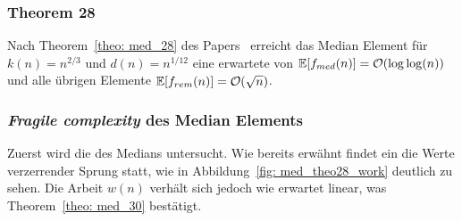 \subsubsection{Theorem 28}		%

\noindent
Nach Theorem~\ref{theo: med_28} des Papers~\cite{meyer2} erreicht das Median Element für $k(n)=n^{2/3}$ und $d(n)=n^{1/12}$ eine erwartete \fg von $\mathbb{E}[f_{med}(n)]=\mathcal{O}(\log\log(n))$ und alle übrigen Elemente $\mathbb{E}[f_{rem}(n)]=\mathcal{O}(\sqrt{n})$.\\[.1cm]





\subsubsection*{\textit{Fragile complexity} des Median Elements}
Zuerst wird die \fg des Medians \fgM untersucht. Wie bereits erwähnt findet ein die Werte verzerrender Sprung statt, wie in Abbildung~\ref{fig: med_theo28_work} deutlich zu sehen. Die Arbeit $w(n)$ verhält sich jedoch wie erwartet linear, was Theorem~\ref{theo: med_30} bestätigt.

